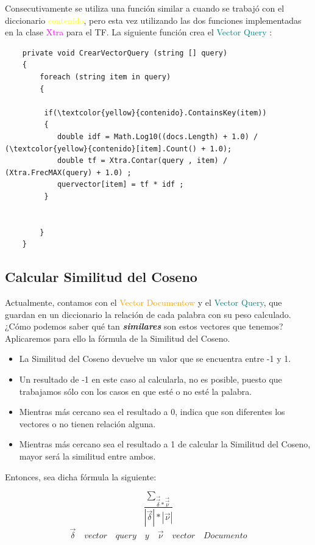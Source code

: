 \documentclass{article}
\begin{document}
Consecutivamente se utiliza una función similar a cuando se trabajó con el diccionario \textcolor{yellow}{contenido}, pero esta vez utilizando las dos funciones implementadas en la clase \textcolor{magenta}{Xtra} para el TF. La siguiente función crea el \textcolor{teal}{Vector Query} :
\begin{lstlisting}
    private void CrearVectorQuery (string [] query)                         
    {
        foreach (string item in query)
        {

         if(\textcolor{yellow}{contenido}.ContainsKey(item))
         {
            double idf = Math.Log10((docs.Length) + 1.0) / (\textcolor{yellow}{contenido}[item].Count() + 1.0);
            double tf = Xtra.Contar(query , item) / (Xtra.FrecMAX(query) + 1.0) ;     
            quervector[item] = tf * idf ;
         }
            
         
        }
    }
\end{lstlisting}

\subsection{Calcular Similitud del Coseno}
Actualmente, contamos con el \textcolor{orange}{Vector Documentow} y el \textcolor{teal}{Vector Query}, que guardan en un diccionario la relación de cada palabra con su peso calculado. ¿Cómo podemos saber qué tan \textbf{\emph{similares}} son estos vectores que tenemos?
Aplicaremos para ello la fórmula de la Similitud del Coseno.
\begin{itemize}
    \item La Similitud del Coseno devuelve un valor que se encuentra entre -1 y 1.
    \item Un  resultado de -1 en este caso al calcularla, no es posible, puesto que trabajamos sólo con los casos en que esté o no esté la palabra.
    \item Mientras más cercano sea el resultado a 0, indica que son diferentes los vectores o no tienen relación alguna.
    \item Mientras más cercano sea el resultado a 1 de calcular la Similitud del Coseno, mayor será la similitud entre ambos.

\end{itemize}
Entonces, sea dicha fórmula la siguiente:

\begin{equation}
    \frac{\sum_{\vec{\vec{\delta}}  *  \vec{\vec{\nu}} } } {|\vec{\delta} | * |\vec{\nu} |} 
\end{equation}
\begin{equation}\vec{\delta}\quad vector\quad query\quad y\quad \vec{\nu}\quad vector\quad Documento \end{equation}
\end{document}
